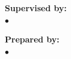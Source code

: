 \begin{titlepage}
\begin{center}
\begin{minipage}[t]{0.46\textwidth}\raggedright
  {\large\bfseries Supervised by:}\\[6pt]
  {\large $\bullet$~\thesissupervisor}
\end{minipage}
\hfill
\begin{minipage}[t]{0.46\textwidth}\raggedright
  {\large\bfseries Prepared by:}\\[6pt]
  {\large $\bullet$~\thesisstudentone}\\
  \ifx\thesisstudenttwo\empty\else{\large $\bullet$~\thesisstudenttwo}\\\fi
  \ifx\thesisstudentthree\empty\else{\large $\bullet$~\thesisstudentthree}\\\fi
\end{minipage}

\vspace{28pt}
{\large\bfseries \thesisyear}

\end{center}
\end{titlepage}

